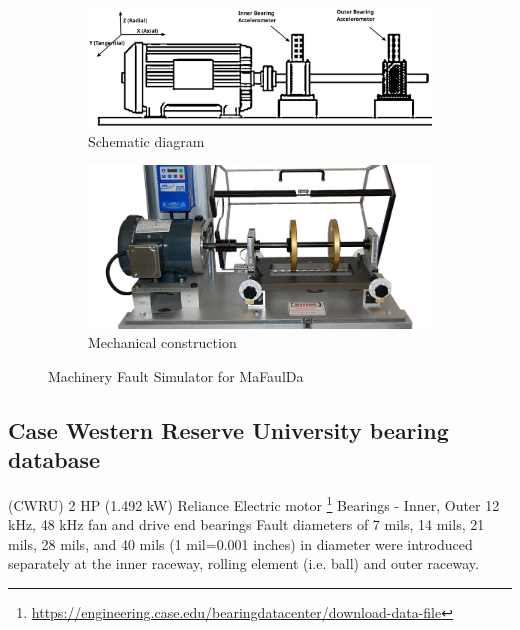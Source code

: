 \begin{figure}[h]
\centering
\begin{subfigure}[b]{0.48\textwidth}
	\includegraphics[width=\textwidth]{assets/mafaulda-simulator.png}
	\caption{Schematic diagram \cite{pestana-viana_influence_2016}}
\end{subfigure}
\hfill
\begin{subfigure}[b]{0.48\textwidth}
	\includegraphics[width=\textwidth]{assets/machinery-fault-simulator.jpg}
	\caption{Mechanical construction \cite{noauthor_spectraquest_nodate}}
\end{subfigure}
\caption{Machinery Fault Simulator for MaFaulDa}
\label{fig:mafaulda-simulator}
\end{figure}



\subsection{Case Western Reserve University bearing database}
(CWRU) 
2 HP (1.492 kW) Reliance Electric motor \footnote{\url{https://engineering.case.edu/bearingdatacenter/download-data-file}}
Bearings - Inner, Outer
12 kHz, 48 kHz
fan and drive end bearings
Fault diameters of 7 mils, 14 mils, 21 mils, 28 mils, and 40 mils (1 mil=0.001 inches) in diameter were introduced separately at the inner raceway, rolling element (i.e. ball) and outer raceway. 



